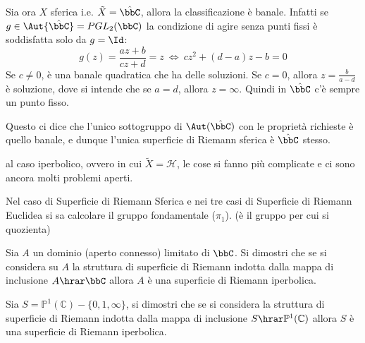 Sia ora $X$ sferica i.e. $\tilde {X}=\hat{\bbC}$, allora la classificazione è banale. Infatti se $g\in\Aut{\hat{\bbC}}=PGL_2(\bbC)$ la condizione di agire senza punti fissi è soddisfatta solo da $g=\Id$:
$$g(z)=\frac{az+b}{cz+d}=z\ \Leftrightarrow\ cz^2+(d-a)z-b=0$$
Se $c\neq0$, è una banale quadratica che ha delle soluzioni. Se $c=0$, allora $z=\frac{b}{a-d}$ è soluzione, dove si intende che se $a=d$, allora $z=\infty$. Quindi in $\hat{\bbC}$ c'è sempre un punto fisso.

Questo ci dice che l'unico sottogruppo di $\Aut(\hat\bbC)$ con le proprietà richieste è quello banale, e dunque l'unica superficie di Riemann sferica è $\hat\bbC$ stesso.


 al caso iperbolico, ovvero in cui $\tilde X=\mathcal{H}$, le cose si fanno più complicate e ci sono ancora molti problemi aperti.

\begin{osservazione}
Nel caso di Superficie di Riemann Sferica e nei tre casi di Superficie di Riemann Euclidea si sa calcolare il gruppo fondamentale ($\pi_1$). (è il gruppo per cui si quozienta)
\end{osservazione}

\begin{esercizio}
Sia $A$ un dominio (aperto connesso) limitato di $\bbC$. Si dimostri che se si considera su $A$ la struttura di superficie di Riemann indotta dalla mappa di inclusione $A\hrar\bbC$ allora $A$ è una superficie di Riemann iperbolica.
\end{esercizio}



\begin{esercizio}Sia $S=\mathbb{P}^1(\mathbb{C})\minus\{0,1,\infty\}$, si dimostri che se si considera la struttura di superficie di Riemann indotta dalla mappa di inclusione $S\hrar\mathbb{P}^1(\mathbb{C})$ allora $S$ è una superficie di Riemann iperbolica.
\end{esercizio}


